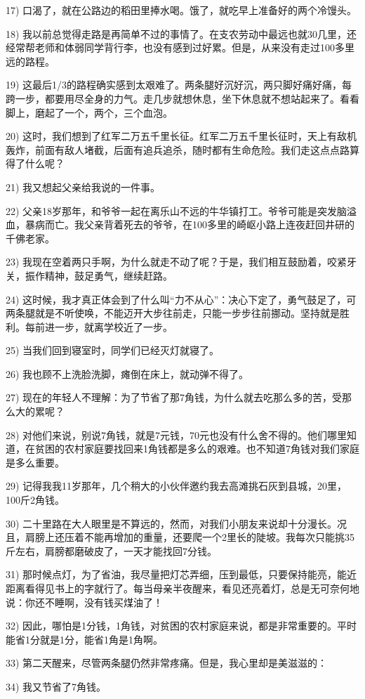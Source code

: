 \documentclass[UTF8,12pt,oneside]{ctexbook}
\begin{document}
{    17) 口渴了，就在公路边的稻田里捧水喝。饿了，就吃早上准备好的两个冷馒头。
    
    18) 我以前总觉得走路是再简单不过的事情了。在支农劳动中最远也就30几里，还经常帮老师和体弱同学背行李，也没有感到过好累。但是，从来没有走过100多里远的路程。
    
    19) 这最后1/3的路程确实感到太艰难了。两条腿好沉好沉，两只脚好痛好痛，每跨一步，都要用尽全身的力气。走几步就想休息，坐下休息就不想站起来了。看看脚上，磨起了一个，两个，三个血泡。
    
    20) 这时，我们想到了红军二万五千里长征。红军二万五千里长征时，天上有敌机轰炸，前面有敌人堵截，后面有追兵追杀，随时都有生命危险。我们走这点点路算得了什么呢？
    
    21) 我又想起父亲给我说的一件事。
    
    22) 父亲18岁那年，和爷爷一起在离乐山不远的牛华镇打工。爷爷可能是突发脑溢血，暴病而亡。我父亲背着死去的爷爷，在100多里的崎岖小路上连夜赶回井研的千佛老家。
    
    23) 我现在空着两只手啊，为什么就走不动了呢？于是，我们相互鼓励着，咬紧牙关，振作精神，鼓足勇气，继续赶路。
    
    24) 这时候，我才真正体会到了什么叫“力不从心”：决心下定了，勇气鼓足了，可两条腿就是不听使唤，不能迈开大步往前走，只能一步步往前挪动。坚持就是胜利。每前进一步，就离学校近了一步。
    
    25) 当我们回到寝室时，同学们已经灭灯就寝了。
    
    26) 我也顾不上洗脸洗脚，瘫倒在床上，就动弹不得了。
    
    27) 现在的年轻人不理解：为了节省了那7角钱，为什么就去吃那么多的苦，受那么大的累呢？
    
    28) 对他们来说，别说7角钱，就是7元钱，70元也没有什么舍不得的。他们哪里知道，在贫困的农村家庭要找回来1角钱都是多么的艰难。也不知道7角钱对我们家庭是多么重要。
    
    29) 记得我我11岁那年，几个稍大的小伙伴邀约我去高滩挑石灰到县城，20里，100斤2角钱。
    
    30) 二十里路在大人眼里是不算远的，然而，对我们小朋友来说却十分漫长。况且，肩膀上还压着不能再增加的重量，还要爬一个2里长的陡坡。我每次只能挑35斤左右，肩膀都磨破皮了，一天才能找回7分钱。
    
    31) 那时候点灯，为了省油，我尽量把灯芯弄细，压到最低，只要保持能亮，能近距离看得见书上的字就行了。每当母亲半夜醒来，看见还亮着灯，总是无可奈何地说：你还不睡啊，没有钱买煤油了！
    
    32) 因此，哪怕是1分钱，1角钱，对贫困的农村家庭来说，都是非常重要的。平时能省1分就是1分，能省1角是1角啊。
    
    33) 第二天醒来，尽管两条腿仍然非常疼痛。但是，我心里却是美滋滋的：
    
    34) 我又节省了7角钱。  
    ~\\
    }
    
\end{document}
